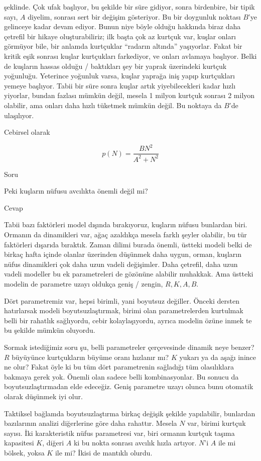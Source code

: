 \documentclass[12pt,fleqn]{article}\usepackage{../../common}
\begin{document}
şeklinde. Çok ufak başlıyor, bu şekilde bir süre gidiyor, sonra birdenbire, bir
tipik sayı, $A$ diyelim, sonrası sert bir değişim gösteriyor. Bu bir doygunluk
noktası $B$'ye gelinceye kadar devam ediyor. Bunun niye böyle olduğu hakkında
biraz daha çetrefil bir hikaye oluşturabiliriz; ilk başta çok az kurtçuk var,
kuşlar onları görmüyor bile, bir anlamda kurtçuklar ``radarın altında''
yaşıyorlar. Fakat bir kritik eşik sonrası kuşlar kurtçukları farkediyor, ve
onları avlamaya başlıyor. Belki de kuşların hassas olduğu / baktıkları şey bir
yaprak üzerindeki kurtçuk yoğunluğu. Yeterince yoğunluk varsa, kuşlar yaprağa
iniş yapıp kurtçukları yemeye başlıyor. Tabii bir süre sonra kuşlar artık
yiyebilecekleri kadar hızlı yiyorlar, bundan fazlası mümkün değil, mesela 1
milyon kurtçuk sonrası 2 milyon olabilir, ama onları daha hızlı tüketmek mümkün
değil. Bu noktaya da $B$'de ulaşılıyor.

Cebirsel olarak

$$ p(N) = \frac{BN^2}{A^2 + N^2} $$

Soru

Peki kuşların nüfusu avcılıkta önemli değil mi?

Cevap

Tabii bazı faktörleri model dışında bırakıyoruz, kuşların nüfusu bunlardan
biri. Ormanın da dinamikleri var, ağaç azaldıkça mesela farklı şeyler olabilir,
bu tür faktörleri dışarıda bıraktık. Zaman dilimi burada önemli, üstteki modeli
belki de birkaç hafta içinde olanlar üzerinden düşünmek daha uygun, orman,
kuşların nüfus dinamikleri çok daha uzun vadeli değişimler. Daha çetrefil, daha
uzun vadeli modeller bu ek parametreleri de gözönüne alabilir muhakkak. Ama
üstteki modelin de parametre uzayı oldukça geniş / zengin, $R,K,A,B$. 

Dört parametremiz var, hepsi birimli, yani boyutsuz değiller. Önceki dersten
hatırlarsak modeli boyutsuzlaştırmak, birimi olan parametrelerden kurtulmak
belli bir rahatlık sağlıyordu, cebir kolaylaşıyordu, ayrıca modelin özüne inmek
te bu şekilde mümkün oluyordu.

Sormak istediğimiz soru şu, belli parametreler çerçevesinde dinamik neye benzer?
$R$ büyüyünce kurtçukların büyüme oranı hızlanır mı? $K$ yukarı ya da aşağı
inince ne olur? Fakat öyle ki bu tüm dört parametrenin sağladığı tüm
olasılıklara bakmaya gerek yok. Önemli olan sadece belli kombinasyonlar. Bu
sonucu da boyutsuzlaştırmadan elde edeceğiz. Geniş parametre uzayı olunca bunu
otomatik olarak düşünmek iyi olur.

Taktiksel bağlamda boyutsuzlaştırma birkaç değişik şekilde yapılabilir,
bunlardan bazılarının analizi diğerlerine göre daha rahattır. Mesela $N$ var,
birimi kurtçuk sayısı. İki karakteristik nüfus parametresi var, biri ormanın
kurtçuk taşıma kapasitesi $K$, diğeri $A$ ki bu nokta sonrası avcılık hızla
artıyor. $N$'i $A$ ile mi bölsek, yoksa $K$ ile mi? İkisi de mantıklı olurdu. 
\end{document}
